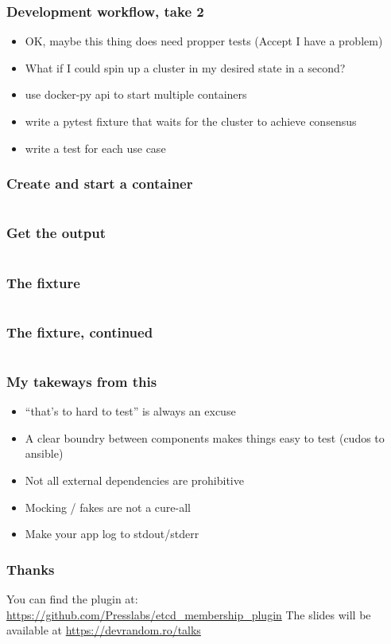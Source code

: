 \documentclass{beamer}
\begin{document}
\begin{frame}
  \frametitle{Development workflow, take 2}
  \begin{itemize}
  \item OK, maybe this thing does need propper tests (Accept I have a problem)
  \item What if I could spin up a cluster in my desired state in a second?
  \item use docker-py api to start multiple containers
  \item write a pytest fixture that waits for the cluster to achieve consensus
  \item write a test for each use case
  \end{itemize}
\end{frame}

\begin{frame}
  \frametitle{Create and start a container}
  \inputminted[fontsize=\footnotesize]{python}{snippets/docker_tests.py}
\end{frame}

\begin{frame}
  \frametitle{Get the output}
  \inputminted[fontsize=\footnotesize]{python}{snippets/docker_stream.py}
\end{frame}

\begin{frame}
  \frametitle{The fixture}
  \inputminted[fontsize=\scriptsize]{python}{snippets/docker_fixture.py}
\end{frame}
  
\begin{frame}
  \frametitle{The fixture, continued}
  \inputminted[fontsize=\scriptsize]{python}{snippets/docker_fixture_2.py}
\end{frame}

\begin{frame}
  \frametitle{My takeways from this}
  \begin{itemize}
  \item ``that's to hard to test'' is always an excuse
  \item A clear boundry between components makes things easy to test (cudos to ansible)
  \item Not all external dependencies are prohibitive
  \item Mocking / fakes are not a cure-all
  \item Make your app log to stdout/stderr
  \end{itemize}
\end{frame}

\begin{frame}
  \frametitle{Thanks}
  You can find the plugin at:
  \href{https://github.com/Presslabs/etcd_membership_plugin}{https://github.com/Presslabs/etcd\_membership\_plugin}
  \newline
  \newline
  The slides will be available at
  \href{https://devrandom.ro/talks}{https://devrandom.ro/talks}
\end{frame}
\end{document}
